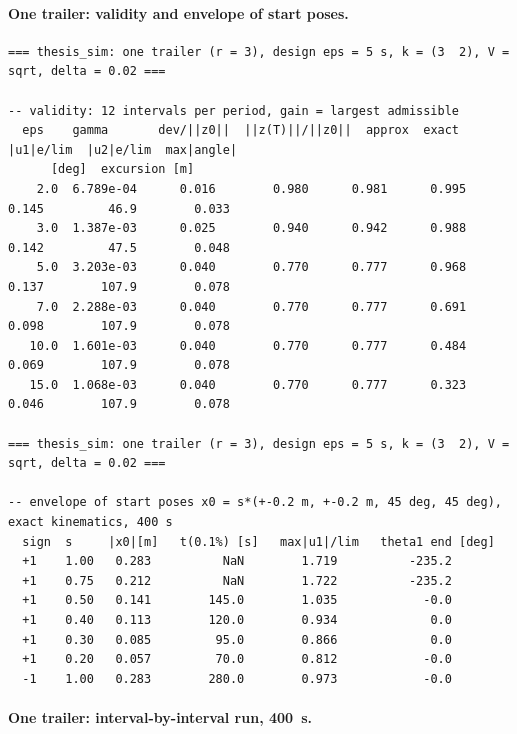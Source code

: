 \paragraph{One trailer: validity and envelope of start poses.}

{\scriptsize\begin{verbatim}
=== thesis_sim: one trailer (r = 3), design eps = 5 s, k = (3  2), V = sqrt, delta = 0.02 ===

-- validity: 12 intervals per period, gain = largest admissible
  eps    gamma       dev/||z0||  ||z(T)||/||z0||  approx  exact   |u1|e/lim  |u2|e/lim  max|angle|
      [deg]  excursion [m]
    2.0  6.789e-04      0.016        0.980      0.981      0.995     0.145         46.9        0.033
    3.0  1.387e-03      0.025        0.940      0.942      0.988     0.142         47.5        0.048
    5.0  3.203e-03      0.040        0.770      0.777      0.968     0.137        107.9        0.078
    7.0  2.288e-03      0.040        0.770      0.777      0.691     0.098        107.9        0.078
   10.0  1.601e-03      0.040        0.770      0.777      0.484     0.069        107.9        0.078
   15.0  1.068e-03      0.040        0.770      0.777      0.323     0.046        107.9        0.078

=== thesis_sim: one trailer (r = 3), design eps = 5 s, k = (3  2), V = sqrt, delta = 0.02 ===

-- envelope of start poses x0 = s*(+-0.2 m, +-0.2 m, 45 deg, 45 deg), exact kinematics, 400 s
  sign  s     |x0|[m]   t(0.1%) [s]   max|u1|/lim   theta1 end [deg]
  +1    1.00   0.283          NaN        1.719          -235.2
  +1    0.75   0.212          NaN        1.722          -235.2
  +1    0.50   0.141        145.0        1.035            -0.0
  +1    0.40   0.113        120.0        0.934             0.0
  +1    0.30   0.085         95.0        0.866             0.0
  +1    0.20   0.057         70.0        0.812            -0.0
  -1    1.00   0.283        280.0        0.973            -0.0
\end{verbatim}}

\paragraph{One trailer: interval-by-interval run, \SI{400}{s}.}


